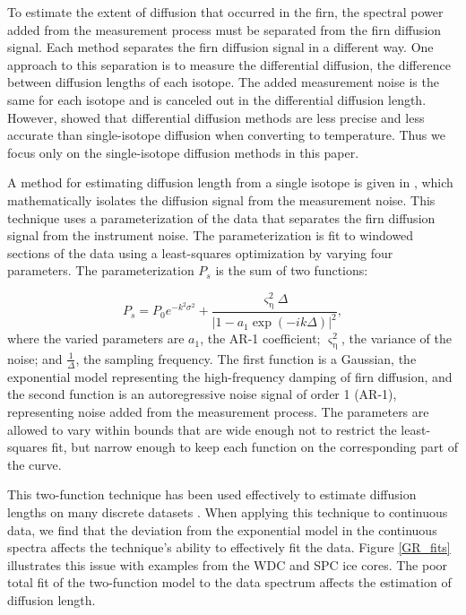 \documentclass[draft, jgrga]{AGUTeX}
\begin{document}
\begin{article}
To estimate the extent of diffusion that occurred in the firn, the spectral power added from the measurement process must be separated from the firn diffusion signal. Each method separates the firn diffusion signal in a different way. One approach to this separation is to measure the differential diffusion, the difference between diffusion lengths of each isotope. The added measurement noise is the same for each isotope and is canceled out in the differential diffusion length. However, \citet{Holme2017} showed that differential diffusion methods are less precise and less accurate than single-isotope diffusion when converting to temperature. Thus we focus only on the single-isotope diffusion methods in this paper.

A method for estimating diffusion length from a single isotope is given in \citet{Gkinis2014}, which mathematically isolates the diffusion signal from the measurement noise. This technique uses a parameterization of the data that separates the firn diffusion signal from the instrument noise. The parameterization is fit to windowed sections of the data using a least-squares optimization by varying four parameters. The parameterization $P_s$ is the sum of two functions:

\begin{equation}
P_s =    P_0 {e}^{-k^2 \sigma^2} + \frac{\varsigma_{\mathrm{\eta}}^2 \Delta}
{\left| 1-a_1 \exp{\left( -i k  \Delta \right) } \right|^2},
\label{eq:powerspectrum}
\end{equation}
where the varied parameters are $a_1$, the AR-1 coefficient; $\varsigma_{\mathrm{\eta}}^2$, the variance of the noise; and $\frac{1}{\Delta}$, the sampling frequency. The first function is a Gaussian, the exponential model representing the high-frequency damping of firn diffusion, and the second function is an autoregressive noise signal of order 1 (AR-1), representing noise added from the measurement process. The parameters are allowed to vary within bounds that are wide enough not to restrict the least-squares fit, but narrow enough to keep each function on the corresponding part of the curve.

This two-function technique has been used effectively to estimate diffusion lengths on many discrete datasets \citep{Gkinis2014,Holme2017}. When applying this technique to continuous data, we find that the deviation from the exponential model in the continuous spectra affects the technique's ability to effectively fit the data. Figure \ref{GR_fits} illustrates this issue with examples from the WDC and SPC ice cores. The poor total fit of the two-function model to the data spectrum affects the estimation of diffusion length.


\end{article}
\end{document}
